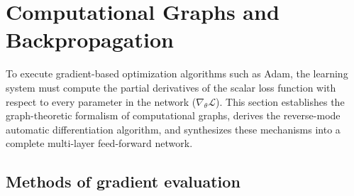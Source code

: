 \documentclass[../../../main.tex]{subfiles}
\begin{document}
\clearpage
\section{Computational Graphs and Backpropagation}
\label{sec:computational_graphs_ffn}

To execute gradient-based optimization algorithms such as Adam, the learning system must compute the partial derivatives of the scalar loss function with respect to every parameter in the network ($\nabla_\theta \mathcal{L}$). This section establishes the graph-theoretic formalism of computational graphs, derives the reverse-mode automatic differentiation algorithm, and synthesizes these mechanisms into a complete multi-layer feed-forward network.

\subsection{Methods of gradient evaluation}
\label{subsec:gradient_evaluation_methods}
\end{document}
